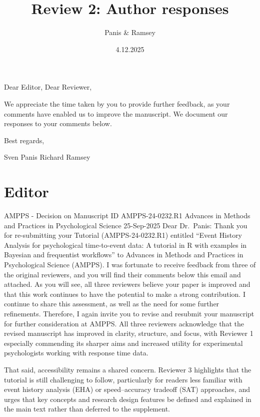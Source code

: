 \documentclass[
]{article}
\title{Review 2: Author responses}
\author{Panis \& Ramsey}
\date{4.12.2025}
\renewenvironment{quote}{\begin{leftbar}}{\end{leftbar}}
\begin{document}
\maketitle

Dear Editor, Dear Reviewer,

We appreciate the time taken by you to provide further feedback, as your
comments have enabled us to improve the manuscript. We document our
responses to your comments below.

Best regards,

Sven Panis Richard Ramsey

\section{Editor}\label{editor}

\begin{quote}
AMPPS - Decision on Manuscript ID AMPPS-24-0232.R1 Advances in Methods
and Practices in Psychological Science 25-Sep-2025 Dear Dr.~Panis: Thank
you for re-submitting your Tutorial (AMPPS-24-0232.R1) entitled ``Event
History Analysis for psychological time-to-event data: A tutorial in R
with examples in Bayesian and frequentist workflows'' to Advances in
Methods and Practices in Psychological Science (AMPPS). I was fortunate
to receive feedback from three of the original reviewers, and you will
find their comments below this email and attached. As you will see, all
three reviewers believe your paper is improved and that this work
continues to have the potential to make a strong contribution. I
continue to share this assessment, as well as the need for some further
refinements. Therefore, I again invite you to revise and resubmit your
manuscript for further consideration at AMPPS. All three reviewers
acknowledge that the revised manuscript has improved in clarity,
structure, and focus, with Reviewer 1 especially commending its sharper
aims and increased utility for experimental psychologists working with
response time data.
\end{quote}

\begin{quote}
That said, accessibility remains a shared concern. Reviewer 3 highlights
that the tutorial is still challenging to follow, particularly for
readers less familiar with event history analysis (EHA) or
speed--accuracy tradeoff (SAT) approaches, and urges that key concepts
and research design features be defined and explained in the main text
rather than deferred to the supplement.
\end{quote}
\end{document}
